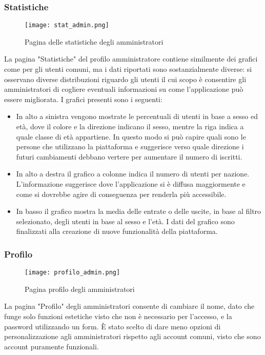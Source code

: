 \documentclass[binding=0.6cm, oneside, noexaminfo, italian]{sapthesis}
\begin{document}
\subsubsection{Statistiche}
\begin{figure}[h]
    \centering
    \texttt{[image: stat\_admin.png]}
    \caption{Pagina delle statistiche degli amministratori}
    \label{fig:statistiche_admin}
\end{figure}
La pagina "Statistiche" del profilo amministratore contiene similmente dei grafici come per gli utenti comuni, ma i dati riportati sono sostanzialmente diverse: si osservano diverse distribuzioni riguardo gli utenti il cui scopo è consentire gli amministratori di cogliere eventuali informazioni su come l'applicazione può essere migliorata.
I grafici presenti sono i seguenti:
\begin{itemize}
    \item In alto a sinistra vengono mostrate le percentuali di utenti in base a sesso ed età, dove il colore e la direzione indicano il sesso, mentre la riga indica a quale classe di età appartiene. In questo modo si può capire quali sono le persone che utilizzano la piattaforma e suggerisce verso quale direzione i futuri cambiamenti debbano vertere per aumentare il numero di iscritti.
    \item In alto a destra il grafico a colonne indica il numero di utenti per nazione. L'informazione suggerisce dove l'applicazione si è diffusa maggiormente e come si dovrebbe agire di conseguenza per renderla più accessibile.
    \item In basso il grafico mostra la media delle entrate o delle uscite, in base al filtro selezionato, degli utenti in base al sesso e l'età. I dati del grafico sono finalizzati alla creazione di nuove funzionalità della piattaforma.
\end{itemize}
\subsubsection{Profilo}
\begin{figure}[h]
    \centering
    \texttt{[image: profilo\_admin.png]}
    \caption{Pagina profilo degli amministratori}
    \label{fig:profilo_admin}
\end{figure}
La pagina "Profilo" degli amministratori consente di cambiare il nome, dato che funge solo funzioni estetiche visto che non è necessario per l'accesso, e la password utilizzando un form. \MakeUppercase{è} stato scelto di dare meno opzioni di personalizzazione agli amministratori rispetto agli account comuni, visto che sono account puramente funzionali.
\newpage
\end{document}
